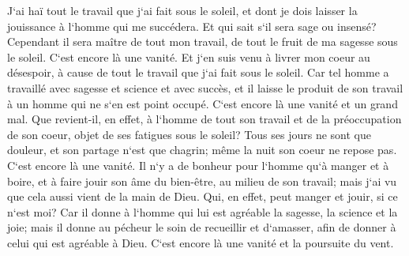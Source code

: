 \verse J`ai haï tout le travail que j`ai fait sous le soleil, et dont je dois laisser la jouissance à l`homme qui me succédera. 
\verse Et qui sait s`il sera sage ou insensé? Cependant il sera maître de tout mon travail, de tout le fruit de ma sagesse sous le soleil. C`est encore là une vanité. 
\verse Et j`en suis venu à livrer mon coeur au désespoir, à cause de tout le travail que j`ai fait sous le soleil. 
\verse Car tel homme a travaillé avec sagesse et science et avec succès, et il laisse le produit de son travail à un homme qui ne s`en est point occupé. C`est encore là une vanité et un grand mal. 
\verse Que revient-il, en effet, à l`homme de tout son travail et de la préoccupation de son coeur, objet de ses fatigues sous le soleil? 
\verse Tous ses jours ne sont que douleur, et son partage n`est que chagrin; même la nuit son coeur ne repose pas. C`est encore là une vanité. 
\verse Il n`y a de bonheur pour l`homme qu`à manger et à boire, et à faire jouir son âme du bien-être, au milieu de son travail; mais j`ai vu que cela aussi vient de la main de Dieu. 
\verse Qui, en effet, peut manger et jouir, si ce n`est moi? 
\verse Car il donne à l`homme qui lui est agréable la sagesse, la science et la joie; mais il donne au pécheur le soin de recueillir et d`amasser, afin de donner à celui qui est agréable à Dieu. C`est encore là une vanité et la poursuite du vent. 

\chapter{}

